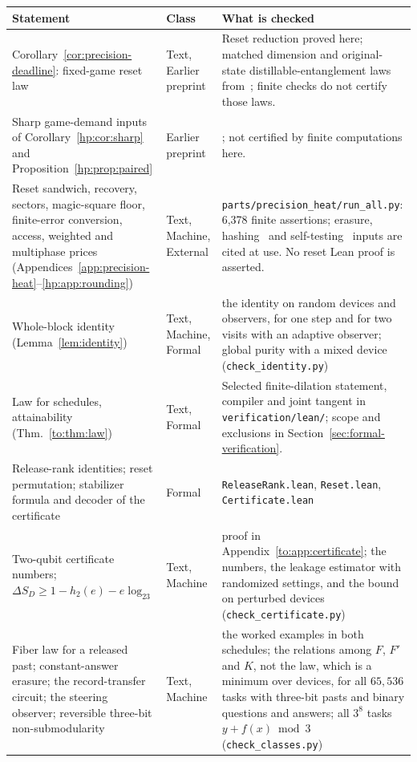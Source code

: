 \begin{table}[tp]
\centering
\scriptsize
\begin{tabular}{@{}>{\raggedright\arraybackslash}p{5.6cm}>{\raggedright\arraybackslash}p{2.4cm}>{\raggedright\arraybackslash}p{7.6cm}@{}}
\toprule
Statement & Class & What is checked\\
\midrule
Corollary~\ref{cor:precision-deadline}: fixed-game reset law & Text, Earlier preprint & Reset reduction proved here; matched dimension and original-state distillable-entanglement laws from~\cite[Theorem~1.1]{HPuncomputable}; finite checks do not certify those laws.\\
Sharp game-demand inputs of Corollary~\ref{hp:cor:sharp} and Proposition~\ref{hp:prop:paired} & Earlier preprint & \cite[Theorem~11.9 and Corollary~11.11]{HPprecision}; not certified by finite computations here.\\
Reset sandwich, recovery, sectors, magic-square floor, finite-error conversion, access, weighted and multiphase prices (Appendices~\ref{app:precision-heat}--\ref{hp:app:rounding}) & Text, Machine, External & \texttt{parts/precision\_heat/run\_all.py}: 6,378 finite assertions; erasure, hashing~\cite{HPdw} and self-testing~\cite{HPcs,HPwu} inputs are cited at use. No reset Lean proof is asserted.\\
Whole-block identity (Lemma~\ref{lem:identity}) & Text, Machine, Formal & the identity on random devices and observers, for one step and for two visits with an adaptive observer; global purity with a mixed device (\texttt{check\_identity.py})\\
Law for schedules, attainability (Thm.~\ref{to:thm:law}) & Text, Formal & Selected finite-dilation statement, compiler and joint tangent in \texttt{verification/lean/}; scope and exclusions in Section~\ref{sec:formal-verification}.\\
Release-rank identities; reset permutation; stabilizer formula and decoder of the certificate & Formal & \texttt{ReleaseRank.lean}, \texttt{Reset.lean}, \texttt{Certificate.lean}\\
Two-qubit certificate numbers; $\Delta S_D\ge1-h_2(e)-e\log_23$ & Text, Machine & proof in Appendix~\ref{to:app:certificate}; the numbers, the leakage estimator with randomized settings, and the bound on perturbed devices (\texttt{check\_certificate.py})\\
Fiber law for a released past; constant-answer erasure; the record-transfer circuit; the steering observer; reversible three-bit non-submodularity & Text, Machine & the worked examples in both schedules; the relations among $F$, $F'$ and $K$, not the law, which is a minimum over devices, for all $65{,}536$ tasks with three-bit pasts and binary questions and answers; all $3^8$ tasks $y+f(x)\bmod3$ (\texttt{check\_classes.py})\\

\end{tabular}
\end{table}
